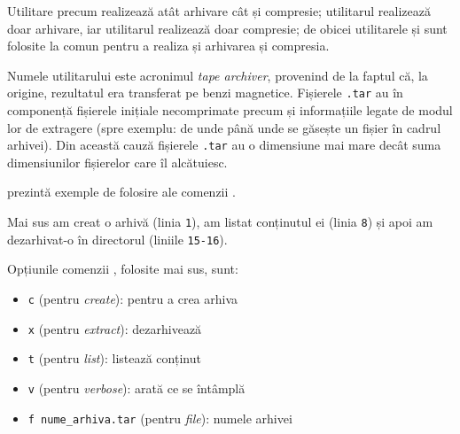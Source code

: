 Utilitare precum  realizează atât arhivare cât și compresie;
utilitarul  realizează doar arhivare, iar utilitarul  realizează doar compresie;
de obicei utilitarele  și  sunt folosite la comun pentru a realiza și arhivarea și compresia.

Numele utilitarului  este acronimul \textit{tape archiver}, provenind de la faptul că, la origine, rezultatul era transferat pe benzi magnetice.
Fișierele \texttt{.tar} au în componență fișierele inițiale necomprimate precum și informațiile legate de modul lor de extragere (spre exemplu: de unde până unde se găsește un fișier în cadrul arhivei).
Din această cauză fișierele \texttt{.tar} au o dimensiune mai mare decât suma dimensiunilor fișierelor care îl alcătuiesc.

 prezintă exemple de folosire ale comenzii .


Mai sus am creat o arhivă  (linia \texttt{1}), am listat conținutul ei (linia \texttt{8}) și apoi am dezarhivat-o în directorul  (liniile \texttt{15-16}).

Opțiunile comenzii , folosite mai sus, sunt:
\begin{itemize}
  \item \texttt{c} (pentru \textit{create}): pentru a crea arhiva
  \item \texttt{x} (pentru \textit{extract}): dezarhivează
  \item \texttt{t} (pentru \textit{list}): listează conținut
  \item \texttt{v} (pentru \textit{verbose}): arată ce se întâmplă
  \item \texttt{f nume\_arhiva.tar} (pentru \textit{file}): numele arhivei
\end{itemize}

